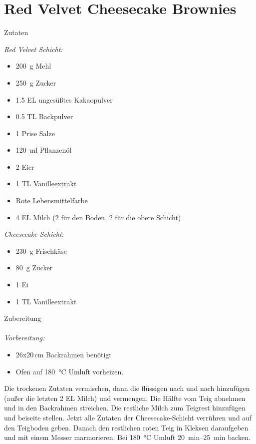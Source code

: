 \section*{Red Velvet Cheesecake Brownies}
\ihead{}\ohead{}
\cfoot{}
{\Large Zutaten}
\begin{multicols}{2}
\textit{Red Velvet Schicht:}
\begin{itemize}
    \item \SI{200}{g} Mehl
    \item \SI{250}{g} Zucker
    \item \num{1.5} EL ungesüßtes Kakaopulver
    \item \num{0.5} TL Backpulver
    \item \num{1} Prise Salze
    \item \SI{120}{ml} Pflanzenöl
    \item \num{2} Eier
    \item \num{1} TL Vanilleextrakt
    \item Rote Lebensmittelfarbe
    \item \num{4} EL Milch (\num{2} für den Boden, \num{2} für die obere Schicht)
\end{itemize}
\textit{Cheesecake-Schicht:}
\begin{itemize}
    \item \SI{230}{g} Frischkäse
    \item \SI{80}{g} Zucker
    \item \num{1} Ei
    \item \num{1} TL Vanilleextrakt
\end{itemize}
\end{multicols}
\noindent
{\Large Zubereitung}\\
\\
\textit{Vorbereitung:} 
\begin{itemize}
    \item \num{26}x\num{20}\,\si{cm} Backrahmen benötigt
    \item Ofen auf \SI{180}{\celsius} Umluft vorheizen.
\end{itemize}
Die trockenen Zutaten vermischen, dann die flüssigen nach und nach hinzufügen (außer die letzten \num{2} EL Milch) und vermengen.
Die Hälfte vom Teig abnehmen und in den Backrahmen streichen. 
Die restliche Milch zum Teigrest hinzufügen und beiseite stellen.
Jetzt alle Zutaten der Cheesecake-Schicht verrühren und auf den Teigboden geben.
Danach den restlichen roten Teig in Kleksen daraufgeben und mit einem Messer marmorieren. 
Bei \SI{180}{\celsius} Umluft \SIrange{20}{25}{min} backen.
